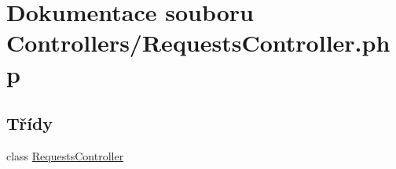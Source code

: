 \hypertarget{_requests_controller_8php}{\section{Dokumentace souboru Controllers/\-Requests\-Controller.php}
\label{_requests_controller_8php}
}
\subsection*{Třídy}
\begin{DoxyCompactItemize}
\item 
class \hyperlink{class_requests_controller}{Requests\-Controller}
\end{DoxyCompactItemize}
